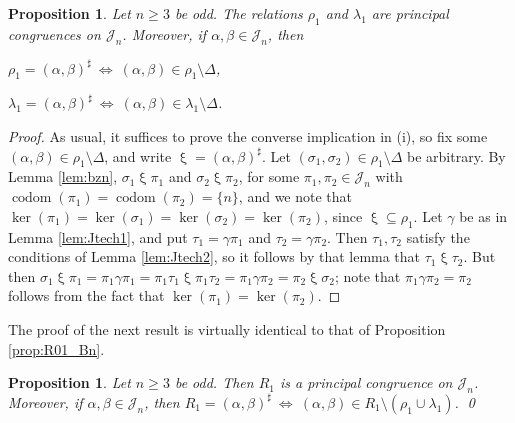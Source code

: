 \documentclass[11pt,a4paper]{article}
\newcommand{\J}{\mathcal J}
\newcommand{\al}{\alpha}
\newcommand{\be}{\beta}
\newcommand{\ga}{\gamma}
\newcommand{\si}{\sigma}
\newcommand{\codom}{\operatorname{codom}}
\newcommand{\cg}[2]{(#1,#2)^\sharp}
\newcommand{\1}{\id_n}
\newcommand{\sm}{\setminus}
\newcommand{\sub}{\subseteq}
\renewcommand{\iff}{\ \Leftrightarrow\ }
\newcommand{\itemit}[1]{\item[\emph{(#1)}]}
\newcommand{\pf}{\begin{proof}}
\newcommand{\epf}{\end{proof}}
\newcommand{\epfres}{\hfill\qed}
\numberwithin{equation}{section}
\newtheorem{prop}[equation]{Proposition}
\theoremstyle{definition}
\begin{document}
\begin{itemize}
\begin{itemize}
\begin{itemize}
\begin{itemize}
\begin{itemize}
\begin{itemize}
\begin{itemize}
\begin{itemize}
\begin{itemize}
\begin{itemize}
\begin{itemize}
%
\begin{prop}\label{prop:rlJodd}
Let $n\geq3$ be odd.  The relations $\rho_1$ and $\lambda_1$ are principal congruences on $\J_n$.  Moreover, if $\al,\be\in\J_n$, then
\begin{itemize}\begin{multicols}{2}
\itemit{i} $\rho_1=\cg\al\be\iff (\al,\be)\in\rho_1\sm\Delta$,
\itemit{ii} $\lambda_1=\cg\al\be\iff (\al,\be)\in\lambda_1\sm\Delta$.
\end{multicols}\end{itemize}
\end{prop}

\pf As usual, it suffices to prove the converse implication in (i), so fix some $(\al,\be)\in\rho_1\sm\Delta$, and
write ${\mathrel\xi}=\cg\al\be$.  
Let $(\si_1,\si_2)\in\rho_1\sm\Delta$ be arbitrary.  
By Lemma \ref{lem:bzn}, $\si_1\mathrel\xi\pi_1$ and $\si_2\mathrel\xi\pi_2$, for some $\pi_1,\pi_2\in\J_n$ with $\codom(\pi_1)=\codom(\pi_2)=\{n\}$, and we note that $\ker(\pi_1)=\ker(\si_1)=\ker(\si_2)=\ker(\pi_2)$, since ${\mathrel\xi}\sub\rho_1$.  
Let $\ga$ be as in Lemma \ref{lem:Jtech1}, and put $\tau_1=\ga\pi_1$ and $\tau_2=\ga\pi_2$.  Then $\tau_1,\tau_2$ satisfy the conditions of Lemma \ref{lem:Jtech2}, so it follows by that lemma that $\tau_1\mathrel\xi\tau_2$.  But then $\si_1\mathrel\xi\pi_1=\pi_1\ga\pi_1=\pi_1\tau_1\mathrel\xi\pi_1\tau_2=\pi_1\ga\pi_2=\pi_2\mathrel\xi\si_2$; note that $\pi_1\ga\pi_2=\pi_2$ follows from the fact that $\ker(\pi_1)=\ker(\pi_2)$. \epf


The proof of the next result is virtually identical to that of Proposition \ref{prop:R01_Bn}.


\begin{prop}\label{prop:R01_Jn}
Let $n\geq3$ be odd.  Then $R_1$ is a principal congruence on $\J_n$.  Moreover, if $\al,\be\in\J_n$, then $R_1=\cg\al\be\iff(\al,\be)\in R_1\sm(\rho_1\cup\lambda_1)$.  \epfres
\end{prop}





\end{itemize}
\end{itemize}
\end{itemize}
\end{itemize}
\end{itemize}
\end{itemize}
\end{itemize}
\end{itemize}
\end{itemize}
\end{itemize}
\end{itemize}
\end{document}
